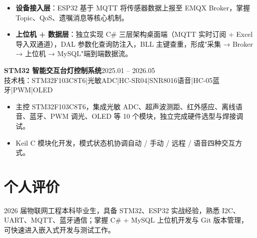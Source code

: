 \documentclass[10pt,a4paper]{article}
\newcommand{\projectblock}[3]{%
    {\bfseries\color{darktext}#1}\hfill{\color{graytext}#2}\\%
    {\small\color{graytext}#3}%
    \vspace{0.2em}%
}
\begin{document}
\begin{itemize}[leftmargin=1.5em, itemsep=2pt, parsep=0pt, topsep=2pt]
    \item \textbf{设备接入层}：ESP32 基于 MQTT 将传感器数据上报至 EMQX Broker，掌握 Topic、QoS、遗嘱消息等核心机制。
    \item \textbf{上位机 + 数据层}：独立实现 C\# 三层架构桌面端（MQTT 实时订阅 + Excel 导入双通道），DAL 参数化查询防注入，BLL 主键查重，形成"采集 → Broker → 上位机 → MySQL"端到端数据流。
\end{itemize}

\vspace{0.15em}

\projectblock{STM32 智能交互台灯控制系统}{2025.01 -- 2026.05}{技术栈：STM32F103C8T6\hspace{0.3em}|\hspace{0.3em}光敏ADC\hspace{0.3em}|\hspace{0.3em}HC-SR04\hspace{0.3em}|\hspace{0.3em}SNR8016语音\hspace{0.3em}|\hspace{0.3em}HC-05蓝牙\hspace{0.3em}|\hspace{0.3em}PWM\hspace{0.3em}|\hspace{0.3em}OLED}

\begin{itemize}[leftmargin=1.5em, itemsep=2pt, parsep=0pt, topsep=2pt]
    \item 主控 STM32F103C8T6，集成光敏 ADC、超声波测距、红外感应、离线语音、蓝牙、PWM 调光、OLED 等 10 个模块，独立完成硬件选型与焊接调试。
    \item Keil C 模块化开发，模式状态机协调自动 / 手动 / 远程 / 语音四种交互方式。
\end{itemize}

\vspace{0.1em}

\section{\faUser\hspace{0.4em}个人评价}

2026 届物联网工程本科毕业生，具备 STM32、ESP32 实战经验，熟悉 I2C、UART、MQTT、蓝牙通信；掌握 C\# + MySQL 上位机开发与 Git 版本管理，可快速进入嵌入式开发与测试工作。
\end{document}

